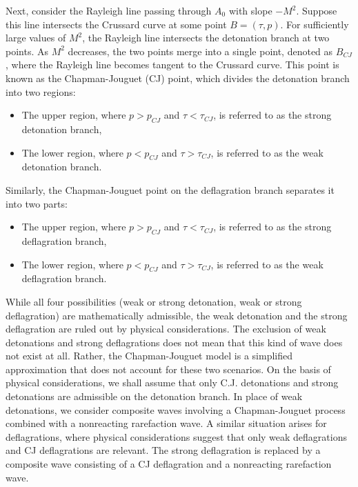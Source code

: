 Next, consider the Rayleigh line passing through $A_0$ with slope $-M^2$.
Suppose this line intersects the Crussard curve at some point $B = (\tau, p)$.
For sufficiently large values of $M^2$, the Rayleigh line intersects the detonation branch at two points.
As $M^2$ decreases, the two points merge into a single point, denoted as $B_{CJ}$, 
where the Rayleigh line becomes tangent to the Crussard curve. This point is known as the Chapman-Jouguet (CJ) point, which divides the detonation branch into two regions:
\begin{itemize}
  \item The upper region, where $p>p_{CJ}$ and $\tau<\tau_{CJ}$, is referred to as the strong detonation branch,
  \item The lower region, where $p<p_{CJ}$ and $\tau>\tau_{CJ}$, is referred to as the weak detonation branch.
\end{itemize}
Similarly, the Chapman-Jouguet point on the deflagration branch separates it into two parts:
\begin{itemize}
  \item The upper region, where $p>p_{CJ}$ and $\tau<\tau_{CJ}$, is referred to as the strong deflagration branch,
  \item The lower region, where $p<p_{CJ}$ and $\tau>\tau_{CJ}$, is referred to as the weak deflagration branch.
\end{itemize}
While all four possibilities (weak or strong detonation, weak or strong deflagration) are mathematically admissible,
the weak detonation and the strong deflagration are ruled out by physical considerations.
The exclusion of weak detonations and strong deflagrations does not mean that this kind of wave does not exist at all.
Rather, the Chapman-Jouguet model is a simplified approximation that does not account for these two scenarios.
On the basis of physical considerations, we shall assume that only C.J. detonations and strong detonations are admissible on the detonation branch. 
In place of weak detonations, we consider composite waves involving a Chapman-Jouguet process combined with a nonreacting rarefaction wave.
A similar situation arises for deflagrations, where physical considerations suggest that only weak deflagrations and CJ deflagrations are relevant. The strong deflagration is replaced by a composite wave consisting of a CJ deflagration and a nonreacting rarefaction wave.
